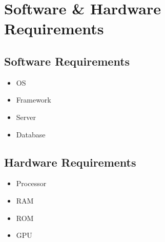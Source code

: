 \graphicspath{ {images/} }
\chapter{Software \& Hardware Requirements}

\section{Software Requirements} 

\begin{itemize}
    \item OS
    \item Framework
    \item Server
    \item Database
\end{itemize}

\section{Hardware Requirements} 
\begin{itemize}
    \item Processor
    \item RAM
    \item ROM
    \item GPU
\end{itemize}



